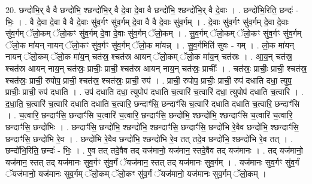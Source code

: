 \documentclass[17pt]{extarticle}
\begin{document}
20. छन्दो॑भि॒र् वै वै छन्दो॑भि॒ श्छन्दो॑भि॒र् वै दे॒वा दे॒वा वै छन्दो॑भि॒ श्छन्दो॑भि॒र् वै दे॒वाः । . छन्दो॑भि॒रिति॒ छन्दः॑ - भिः॒ । . वै दे॒वा दे॒वा वै वै दे॒वाः सु॑व॒र्गꣳ सु॑व॒र्गम् दे॒वा वै वै दे॒वाः सु॑व॒र्गम् । . दे॒वाः सु॑व॒र्गꣳ सु॑व॒र्गम् दे॒वा दे॒वाः सु॑व॒र्गम् ॅलो॒कम् ॅलो॒कꣳ सु॑व॒र्गम् दे॒वा दे॒वाः सु॑व॒र्गम् ॅलो॒कम् । . सु॒व॒र्गम् ॅलो॒कम् ॅलो॒कꣳ सु॑व॒र्गꣳ सु॑व॒र्गम् ॅलो॒क मा॑यन् नायन् ॅलो॒कꣳ सु॑व॒र्गꣳ सु॑व॒र्गम् ॅलो॒क मा॑यन्न् । . सु॒व॒र्गमिति॑ सुवः - गम् । . लो॒क मा॑यन् नायन् ॅलो॒कम् ॅलो॒क मा॑य॒न् चत॑स्र॒ श्चत॑स्र आयन् ॅलो॒कम् ॅलो॒क मा॑य॒न् चत॑स्रः । . आ॒य॒न् चत॑स्र॒ श्चत॑स्र आयन् नाय॒न् चत॑स्रः॒ प्राचीः॒ प्राची॒ श्चत॑स्र आयन् नाय॒न् चत॑स्रः॒ प्राचीः᳚ । . चत॑स्रः॒ प्राचीः॒ प्राची॒ श्चत॑स्र॒ श्चत॑स्रः॒ प्राची॒ रुपोप॒ प्राची॒ श्चत॑स्र॒ श्चत॑स्रः॒ प्राची॒ रुप॑ । . प्राची॒ रुपोप॒ प्राचीः॒ प्राची॒ रुप॑ दधाति दधा॒ त्युप॒ प्राचीः॒ प्राची॒ रुप॑ दधाति । . उप॑ दधाति दधा॒ त्युपोप॑ दधाति च॒त्वारि॑ च॒त्वारि॑ दधा॒ त्युपोप॑ दधाति च॒त्वारि॑ । . द॒धा॒ति॒ च॒त्वारि॑ च॒त्वारि॑ दधाति दधाति च॒त्वारि॒ छन्दाꣳ॑सि॒ छन्दाꣳ॑सि च॒त्वारि॑ दधाति दधाति च॒त्वारि॒ छन्दाꣳ॑सि । . च॒त्वारि॒ छन्दाꣳ॑सि॒ छन्दाꣳ॑सि च॒त्वारि॑ च॒त्वारि॒ छन्दाꣳ॑सि॒ छन्दो॑भि॒ श्छन्दो॑भि॒ श्छन्दाꣳ॑सि च॒त्वारि॑ च॒त्वारि॒ छन्दाꣳ॑सि॒ छन्दो॑भिः । . छन्दाꣳ॑सि॒ छन्दो॑भि॒ श्छन्दो॑भि॒ श्छन्दाꣳ॑सि॒ छन्दाꣳ॑सि॒ छन्दो॑भि रे॒वैव छन्दो॑भि॒ श्छन्दाꣳ॑सि॒ छन्दाꣳ॑सि॒ छन्दो॑भि रे॒व । . छन्दो॑भि रे॒वैव छन्दो॑भि॒ श्छन्दो॑भि रे॒व तत् तदे॒व छन्दो॑भि॒ श्छन्दो॑भि रे॒व तत् । . छन्दो॑भि॒रिति॒ छन्दः॑ - भिः॒ । . ए॒व तत् तदे॒वैव तद् यज॑मानो॒ यज॑मान॒ स्तदे॒वैव तद् यज॑मानः । . तद् यज॑मानो॒ यज॑मान॒ स्तत् तद् यज॑मानः सुव॒र्गꣳ सु॑व॒र्गं ॅयज॑मान॒ स्तत् तद् यज॑मानः सुव॒र्गम् । . यज॑मानः सुव॒र्गꣳ सु॑व॒र्गं ॅयज॑मानो॒ यज॑मानः सुव॒र्गम् ॅलो॒कम् ॅलो॒कꣳ सु॑व॒र्गं ॅयज॑मानो॒ यज॑मानः सुव॒र्गम् ॅलो॒कम् । \newline
\end{document}
